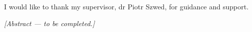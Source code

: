 \documentclass[english]{agh-wi}
\author{Michał Burda}
\begin{document}
\frontmatter
\maketitle

\cleardoublepage
\thispagestyle{empty}
\vspace*{\fill}
\begin{flushright}
    \em
    \begin{minipage}{0.75\textwidth}
        I would like to thank my supervisor, dr Piotr Szwed, for guidance and support.
    \end{minipage}
\end{flushright}

\begin{abstractEN}
    \textit{[Abstract --- to be completed.]}
\end{abstractEN}

\tableofcontents
\listoffigures
\listoftables

\mainmatter










\appendix


\backmatter
\nocite{*}
\printbibliography
\end{document}
